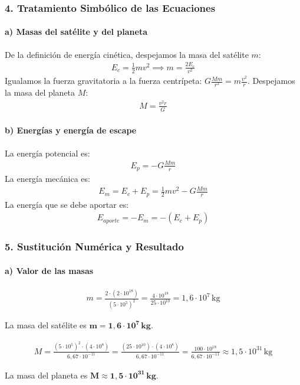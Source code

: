 \subsubsection*{4. Tratamiento Simbólico de las Ecuaciones}
\paragraph*{a) Masas del satélite y del planeta}
De la definición de energía cinética, despejamos la masa del satélite $m$:
\begin{gather}
    E_c = \frac{1}{2} m v^2 \implies m = \frac{2 E_c}{v^2}
\end{gather}
Igualamos la fuerza gravitatoria a la fuerza centrípeta: $G \frac{M m}{r^2} = m \frac{v^2}{r}$. Despejamos la masa del planeta $M$:
\begin{gather}
    M = \frac{v^2 r}{G}
\end{gather}
\paragraph*{b) Energías y energía de escape}
La energía potencial es:
\begin{gather}
    E_p = -G \frac{Mm}{r}
\end{gather}
La energía mecánica es:
\begin{gather}
    E_m = E_c + E_p = \frac{1}{2} m v^2 - G \frac{Mm}{r}
\end{gather}
La energía que se debe aportar es:
\begin{gather}
    E_{aporte} = -E_m = -(E_c + E_p)
\end{gather}

\subsubsection*{5. Sustitución Numérica y Resultado}
\paragraph*{a) Valor de las masas}
\begin{gather}
    m = \frac{2 \cdot (2 \cdot 10^{18})}{(5 \cdot 10^5)^2} = \frac{4 \cdot 10^{18}}{25 \cdot 10^{10}} = 1,6 \cdot 10^7 \, \text{kg}
\end{gather}
\begin{cajaresultado}
    La masa del satélite es $\boldsymbol{m = 1,6 \cdot 10^7 \, \textbf{kg}}$.
\end{cajaresultado}
\medskip
\begin{gather}
    M = \frac{(5 \cdot 10^5)^2 \cdot (4 \cdot 10^8)}{6,67 \cdot 10^{-11}} = \frac{(25 \cdot 10^{10}) \cdot (4 \cdot 10^8)}{6,67 \cdot 10^{-11}} = \frac{100 \cdot 10^{18}}{6,67 \cdot 10^{-11}} \approx 1,5 \cdot 10^{31} \, \text{kg}
\end{gather}
\begin{cajaresultado}
    La masa del planeta es $\boldsymbol{M \approx 1,5 \cdot 10^{31} \, \textbf{kg}}$.
\end{cajaresultado}

